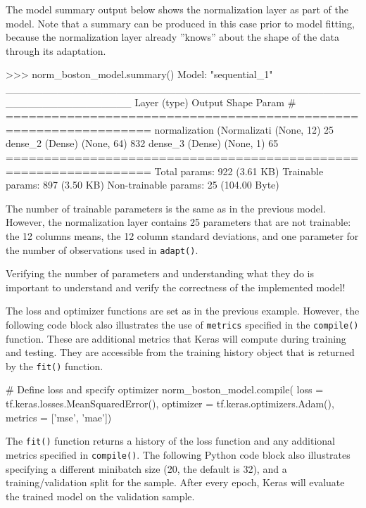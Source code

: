 The model summary output below shows the normalization layer as part of the model. Note that a summary can be produced in this case prior to model fitting, because the normalization layer already ''knows'' about the shape of the data through its adaptation. 

\begin{textcode}
>>> norm_boston_model.summary()
Model: "sequential_1"
_________________________________________________________________
 Layer (type)                Output Shape              Param #   
=================================================================
 normalization (Normalizati  (None, 12)                25        
 dense_2 (Dense)             (None, 64)                832       
 dense_3 (Dense)             (None, 1)                 65        
=================================================================
Total params: 922 (3.61 KB)
Trainable params: 897 (3.50 KB)
Non-trainable params: 25 (104.00 Byte)
\end{textcode}

The number of trainable parameters is the same as in the previous model. However, the normalization layer contains 25 parameters that are not trainable: the 12 columns means, the 12 column standard deviations, and one parameter for the number of observations used in \texttt{adapt()}. 

\begin{alertbox}
Verifying the number of parameters and understanding what they do is important to understand and verify the correctness of the implemented model!
\end{alertbox}

The loss and optimizer functions are set as in the previous example. However, the following code block also illustrates the use of \texttt{metrics} specified in the \texttt{compile()} function. These are additional metrics that Keras will compute during training and testing. They are accessible from the training history object that is returned by the \texttt{fit()} function.

\begin{pythoncode}
# Define loss and specify optimizer
norm_boston_model.compile(
    loss = tf.keras.losses.MeanSquaredError(),
    optimizer = tf.keras.optimizers.Adam(),
    metrics = ['mse', 'mae'])
\end{pythoncode}

\noindent The \texttt{fit()} function returns a history of the loss function and any additional metrics specified in \texttt{compile()}. The following Python code block also illustrates specifying a different minibatch size (20, the default is 32), and a training/validation split for the sample. After every epoch, Keras will evaluate the trained model on the validation sample. 


